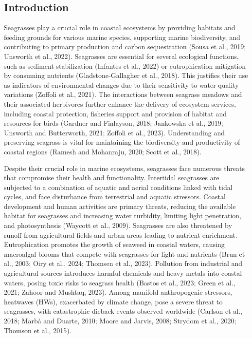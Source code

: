 \documentclass[
  letterpaper,
  11pt,
  english,
  singlespacing,
  headsepline]{MastersDoctoralThesis}
\newcommand{\startonrightwithgap}{%
  \clearpage
  \ifodd\value{page}
    \thispagestyle{empty}\mbox{}\clearpage
    \thispagestyle{empty}\mbox{}\clearpage
  \else
    \thispagestyle{empty}\mbox{}\clearpage
  \fi
}
\begin{document}
\begin{spacing}{1.5}
\startonrightwithgap

\section{Introduction}\label{introduction-4}

Seagrasses play a crucial role in coastal ecosystems by providing
habitats and feeding grounds for various marine species, supporting
marine biodiversity, and contributing to primary production and carbon
sequestration (Sousa et al., 2019; Unsworth et al., 2022). Seagrasses
are essential for several ecological functions, such as sediment
stabilization (Infantes et al., 2022) or eutrophication mitigation by
consuming nutrients (Gladstone-Gallagher et al., 2018). This justifies
their use as indicators of environmental changes due to their
sensitivity to water quality variations (Zoffoli et al., 2021). The
interactions between seagrass meadows and their associated herbivores
further enhance the delivery of ecosystem services, including coastal
protection, fisheries support and provision of habitat and resources for
birds (Gardner and Finlayson, 2018; Jankowska et al., 2019; Unsworth and
Butterworth, 2021; Zoffoli et al., 2023). Understanding and preserving
seagrass is vital for maintaining the biodiversity and productivity of
coastal regions (Ramesh and Mohanraju, 2020; Scott et al., 2018).

Despite their crucial role in marine ecosystems, seagrasses face
numerous threats that compromise their health and functionality.
Intertidal seagrasses are subjected to a combination of aquatic and
aerial conditions linked with tidal cycles, and face disturbance from
terrestrial and aquatic stressors. Coastal development and human
activities are primary threats, reducing the available habitat for
seagrasses and increasing water turbidity, limiting light penetration,
and photosynthesis (Waycott et al., 2009). Seagrasses are also
threatened by runoff from agricultural fields and urban areas leading to
nutrient enrichment. Eutrophication promotes the growth of seaweed in
coastal waters, causing macroalgal blooms that compete with seagrasses
for light and nutrients (Brun et al., 2003; Oiry et al., 2024; Thomsen
et al., 2023). Pollution from industrial and agricultural sources
introduces harmful chemicals and heavy metals into coastal waters,
posing toxic risks to seagrass health (Bastos et al., 2023; Green et
al., 2021; Zahoor and Mushtaq, 2023). Among manifold anthropogenic
stressors, heatwaves (HWs), exacerbated by climate change, pose a severe
threat to seagrasses, with catastrophic dieback events observed
worldwide (Carlson et al., 2018; Marbà and Duarte, 2010; Moore and
Jarvis, 2008; Strydom et al., 2020; Thomson et al., 2015).


\end{spacing}
\end{document}
